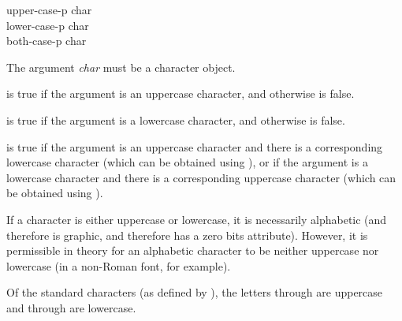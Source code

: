 \begin{defun}[Function]
upper-case-p char \\
lower-case-p char \\
both-case-p char

The argument {\it char} must be a character object.

 is true if the argument is an uppercase
character, and otherwise is false.

 is true if the argument is a lowercase
character, and otherwise is false.

 is true if the argument is an uppercase character and
there is a corresponding lowercase character (which can be obtained
using ), or if the argument is a lowercase character and
there is a corresponding uppercase character (which can be obtained
using ).

If a character is either uppercase or lowercase, it is necessarily
alphabetic (and therefore is graphic, and therefore has a zero bits
attribute).  However, it is permissible in theory for an alphabetic
character to be neither uppercase nor lowercase (in a non-Roman font,
for example).

Of the standard characters (as defined by ),
the letters  through  are uppercase and 
through  are lowercase.
\end{defun}

